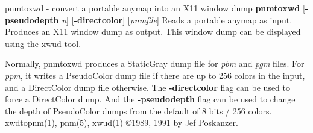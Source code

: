 % 
%
 
%

\newpage
%

pnmtoxwd - convert a portable anymap into an X11 window dump
{\bf pnmtoxwd}
{\rm [}{\bf -pseudodepth}
{\it n}{\rm ]}
{\rm [}{\bf -directcolor}{\rm ]}
{\rm [}{\it pnmfile}{\rm ]}
Reads a portable anymap as input.
Produces an X11 window dump as output.
This window dump can be displayed using the xwud tool.
\par
Normally, pnmtoxwd produces a StaticGray dump file for
{\it pbm}
and
{\it pgm}
files.
For
{\it ppm}{\rm ,}
it writes a PseudoColor dump file if there are up
to 256 colors in the input, and a DirectColor dump file otherwise.
The
{\bf -directcolor}
flag can be used to force a DirectColor dump.
And the
{\bf -pseudodepth}
flag can be used to change the depth of PseudoColor dumps from the default
of 8 bits / 256 colors.
xwdtopnm(1), pnm(5), xwud(1)
\copyright 1989, 1991 by Jef Poskanzer.
%
 
